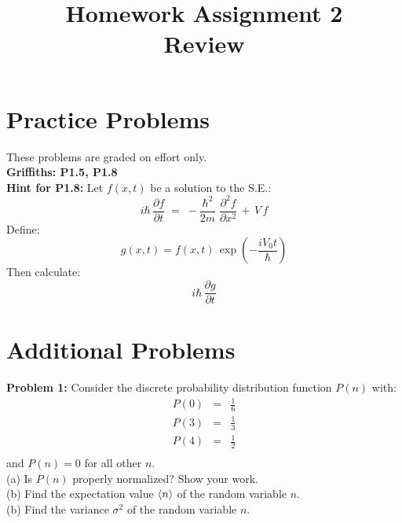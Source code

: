 \documentclass[12pt]{article}
\begin{document}

\date{\vspace{-5ex}}

\title{Homework Assignment 2 \\ Review}

\maketitle

\section*{Practice Problems}

These problems are graded on effort only.\\

\noindent
{\bf Griffiths: P1.5, P1.8} \\

\noindent
{\bf Hint for P1.8:}  Let $f(x,t)$ be a solution to the S.E.:
\begin{displaymath}
i\hbar \, \frac{\partial f}{\partial t} \; = \; - \frac{\hbar^2}{2 m} \; \frac{\partial^2 f}{\partial x^2} \, + \, V \, f
\end{displaymath}
Define:
\begin{displaymath}
g(x,t) = f(x,t) \, \exp(-\frac{i V_0 t}{\hbar})
\end{displaymath}
Then calculate:
\begin{displaymath}
i\hbar \, \frac{\partial g}{\partial t} 
\end{displaymath}

\section*{Additional Problems}

\noindent
    {\bf Problem 1:} Consider the discrete probability distribution function $P(n)$ with:
\begin{eqnarray*}
  P(0) &=& \frac{1}{6}\\[8pt]
  P(3) &=& \frac{1}{3}\\[8pt]
  P(4) &=& \frac{1}{2}\\
\end{eqnarray*}
and $P(n) = 0$ for all other $n$.\\[5pt]
(a) Is $P(n)$ properly normalized?  Show your work.\\[5pt]
(b) Find the expectation value $\braket{n}$ of the random variable $n$.\\[5pt]
(b) Find the variance $\sigma^2$ of the random variable $n$.\\ 
\end{document}

